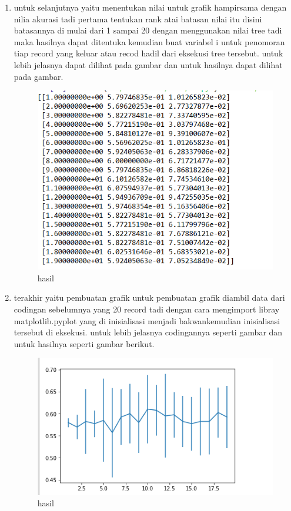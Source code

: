 \begin{enumerate}
\item untuk selanjutnya yaitu menentukan nilai untuk grafik hampirsama dengan nilia akurasi tadi pertama tentukan rank atai batasan nilai itu disini batasannya di mulai dari 1 sampai 20 dengan menggunakan nilai tree tadi maka hasilnya dapat ditentuka kemudian buat variabel i untuk penomoran tiap record yang keluar atau recod hadil dari eksekusi tree tersebut. untuk lebih jelasnya dapat dilihat pada gambar dan untuk hasilnya dapat dilihat pada gambar.

\begin{figure}[ht]
\centering
\includegraphics[scale=0.5]{figures/1174050/chapter2/17.PNG}
\caption{hasil}
\label{contoh}
\end{figure}

\item terakhir yaitu pembuatan grafik untuk pembuatan grafik diambil data dari codingan sebelumnya yang 20 record tadi dengan cara mengimport libray matplotlib.pyplot yang di inisialisasi menjadi bakwankemudian inisialisasi tersebut di eksekusi. untuk lebih jelasnya codingannya seperti gambar dan untuk hasilnya seperti gambar  berikut. 

\begin{figure}[ht]
\centering
\includegraphics[scale=0.5]{figures/1174050/chapter2/18.PNG}
\caption{hasil}
\label{contoh}
\end{figure}
\end{enumerate}

